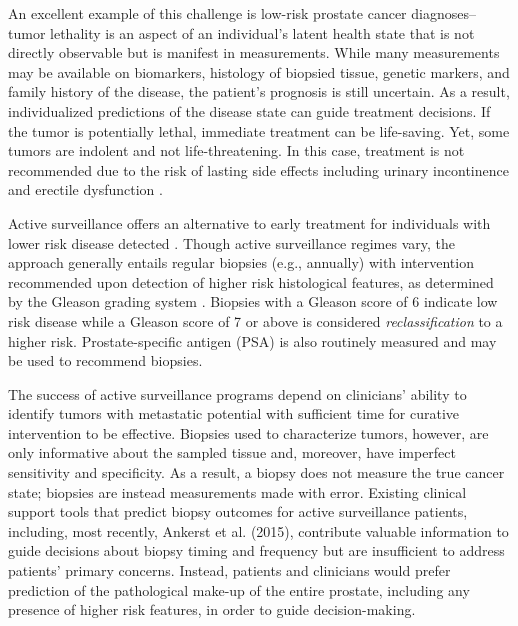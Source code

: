 \documentclass[12pt, letterpaper]{article}
\begin{document}
An excellent example of this challenge is low-risk prostate cancer diagnoses-- tumor lethality is an aspect of an individual's latent health state that is not directly observable but is manifest in measurements. While many measurements may be available on biomarkers, histology of biopsied tissue, genetic markers, and family history of the disease, the patient's prognosis is still uncertain. As a result, individualized predictions of the disease state can guide treatment decisions. If the tumor is potentially lethal, immediate treatment can be life-saving. Yet, some tumors are indolent and not life-threatening. In this case, treatment is not recommended due to the risk of lasting side effects including urinary incontinence and erectile dysfunction \cite{Chou2011a,Chou2011b}.


Active surveillance offers an alternative to early treatment for individuals with lower risk disease detected \cite{Carter2007, Khatami2007, Klotz2010, Soloway2008, Tosoian2011, vanAs2008, vandenBergh2009}. Though active surveillance regimes vary, the approach generally entails regular biopsies (e.g., annually) with intervention recommended upon detection of higher risk histological features, as determined by the Gleason grading system \cite{Gleason1977, Gleason1992}. Biopsies with a Gleason score of 6 indicate low risk disease while a Gleason score of 7 or above is considered \textit{reclassification} to a higher risk. Prostate-specific antigen (PSA) is also routinely measured and may be used to recommend biopsies. 

The success of active surveillance programs depend on clinicians' ability to identify tumors with metastatic potential with sufficient time for curative intervention to be effective. Biopsies used to characterize tumors, however, are only informative about the sampled tissue and, moreover, have imperfect sensitivity and specificity\cite{Epstein2012}. As a result, a biopsy does not measure the true cancer state; biopsies are instead measurements made with error. Existing clinical support tools that predict biopsy outcomes for active surveillance patients, including, most recently, Ankerst et al. (2015)\nocite{Ankerst2015}, contribute valuable information to guide decisions about biopsy timing and frequency but are insufficient to address patients' primary concerns. Instead, patients and clinicians would prefer prediction of the pathological make-up of the entire prostate, including any presence of higher risk features, in order to guide decision-making.
\end{document}
